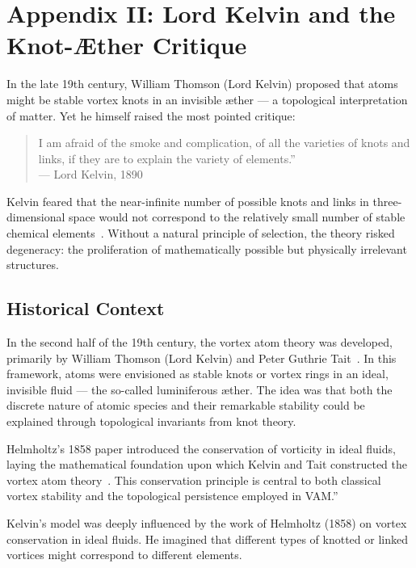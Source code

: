 
\section*{Appendix II: Lord Kelvin and the Knot-Æther Critique}

In the late 19th century, William Thomson (Lord Kelvin) proposed that atoms might be stable vortex knots in an invisible æther — a topological interpretation of matter. Yet he himself raised the most pointed critique:

\begin{quote}
\grqq I am afraid of the smoke and complication, of all the varieties of knots and links, if they are to explain the variety of elements.\textquotedblright \\
— Lord Kelvin, 1890
\end{quote}

Kelvin feared that the near-infinite number of possible knots and links in three-dimensional space would not correspond to the relatively small number of stable chemical elements~\cite{thomson1890knots, tait1877knots}. Without a natural principle of selection, the theory risked degeneracy: the proliferation of mathematically possible but physically irrelevant structures.

\subsection*{Historical Context}

In the second half of the 19th century, the vortex atom theory was developed, primarily by William Thomson (Lord Kelvin) and Peter Guthrie Tait~\cite{thomson1890knots, tait1877knots}. In this framework, atoms were envisioned as stable knots or vortex rings in an ideal, invisible fluid — the so-called luminiferous æther. The idea was that both the discrete nature of atomic species and their remarkable stability could be explained through topological invariants from knot theory.

\grqq Helmholtz's 1858 paper introduced the conservation of vorticity in ideal fluids, laying the mathematical foundation upon which Kelvin and Tait constructed the vortex atom theory~\cite{helmholtz1858vortices}. This conservation principle is central to both classical vortex stability and the topological persistence employed in VAM.\textquotedblright

Kelvin's model was deeply influenced by the work of Helmholtz (1858) on vortex conservation in ideal fluids. He imagined that different types of knotted or linked vortices might correspond to different elements.

